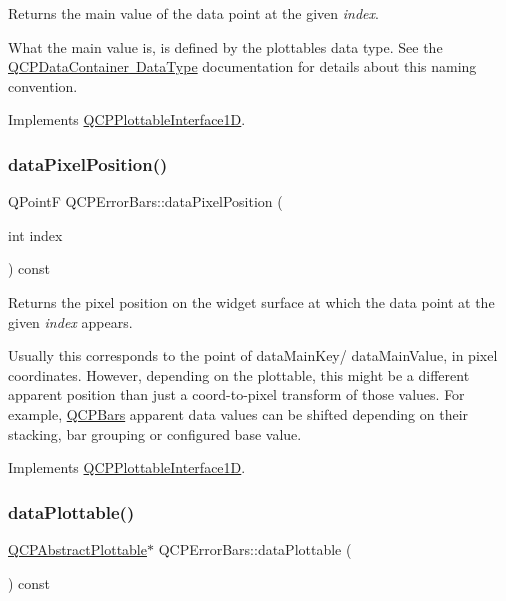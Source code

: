 Returns the main value of the data point at the given {\itshape index}.

What the main value is, is defined by the plottable\textquotesingle{}s data type. See the \mbox{\hyperlink{class_q_c_p_data_container_qcpdatacontainer-datatype}{Q\+C\+P\+Data\+Container Data\+Type}} documentation for details about this naming convention. 

Implements \mbox{\hyperlink{class_q_c_p_plottable_interface1_d_af6330919e8023277d08c958a6074fc76}{Q\+C\+P\+Plottable\+Interface1D}}.

\mbox{\label{class_q_c_p_error_bars_ae79fed6566f1912a97344b20b35faac1}} 
\subsubsection{\texorpdfstring{dataPixelPosition()}{dataPixelPosition()}}
{\footnotesize\ttfamily Q\+PointF Q\+C\+P\+Error\+Bars\+::data\+Pixel\+Position (\begin{DoxyParamCaption}\item[{int}]{index }\end{DoxyParamCaption}) const\hspace{0.3cm}{\ttfamily [virtual]}}

Returns the pixel position on the widget surface at which the data point at the given {\itshape index} appears.

Usually this corresponds to the point of data\+Main\+Key/ data\+Main\+Value, in pixel coordinates. However, depending on the plottable, this might be a different apparent position than just a coord-\/to-\/pixel transform of those values. For example, \mbox{\hyperlink{class_q_c_p_bars}{Q\+C\+P\+Bars}} apparent data values can be shifted depending on their stacking, bar grouping or configured base value. 

Implements \mbox{\hyperlink{class_q_c_p_plottable_interface1_d_a78911838cfbcfd2d8df9ad2fdbfb8e93}{Q\+C\+P\+Plottable\+Interface1D}}.

\mbox{\label{class_q_c_p_error_bars_ad7e5f1229db58d05bb3d8305d2504af8}} 
\subsubsection{\texorpdfstring{dataPlottable()}{dataPlottable()}}
{\footnotesize\ttfamily \mbox{\hyperlink{class_q_c_p_abstract_plottable}{Q\+C\+P\+Abstract\+Plottable}}$\ast$ Q\+C\+P\+Error\+Bars\+::data\+Plottable (\begin{DoxyParamCaption}{ }\end{DoxyParamCaption}) const\hspace{0.3cm}{\ttfamily [inline]}}

